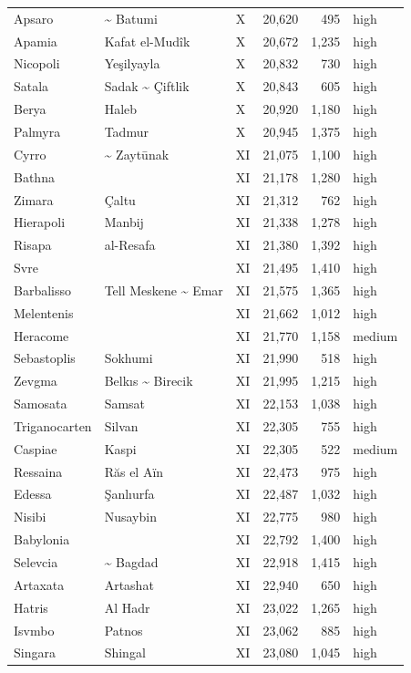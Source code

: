 \documentclass[11pt,a4paper]{article}
\begin{document}
{\begin{longtable}{p{4.6cm}p{5.2cm}lrrl}
Apsaro & \textasciitilde{} Batumi & X & 20,620 & 495 & high\\
Apamia & Kafat el-Mudîk & X & 20,672 & 1,235 & high\\
Nicopoli & Yeşilyayla & X & 20,832 & 730 & high\\
Satala & Sadak \textasciitilde{} Çiftlik & X & 20,843 & 605 & high\\
Berya & Haleb & X & 20,920 & 1,180 & high\\
Palmyra & Tadmur & X & 20,945 & 1,375 & high\\
Cyrro & \textasciitilde{} Zaytūnak & XI & 21,075 & 1,100 & high\\
Bathna &  & XI & 21,178 & 1,280 & high\\
Zimara & Çaltu & XI & 21,312 & 762 & high\\
Hierapoli & Manbij & XI & 21,338 & 1,278 & high\\
Risapa & al-Resafa & XI & 21,380 & 1,392 & high\\
Svre &  & XI & 21,495 & 1,410 & high\\
Barbalisso & Tell Meskene \textasciitilde{} Emar & XI & 21,575 & 1,365 & high\\
Melentenis &  & XI & 21,662 & 1,012 & high\\
Heracome &  & XI & 21,770 & 1,158 & medium\\
Sebastoplis & Sokhumi & XI & 21,990 & 518 & high\\
Zevgma & Belkıs \textasciitilde{} Birecik & XI & 21,995 & 1,215 & high\\
Samosata & Samsat & XI & 22,153 & 1,038 & high\\
Triganocarten & Silvan & XI & 22,305 & 755 & high\\
Caspiae & Kaspi & XI & 22,305 & 522 & medium\\
Ressaina & Răs el Aïn & XI & 22,473 & 975 & high\\
Edessa & Şanlıurfa & XI & 22,487 & 1,032 & high\\
Nisibi & Nusaybin & XI & 22,775 & 980 & high\\
Babylonia &  & XI & 22,792 & 1,400 & high\\
Selevcia & \textasciitilde{} Bagdad & XI & 22,918 & 1,415 & high\\
Artaxata & Artashat & XI & 22,940 & 650 & high\\
Hatris & Al Hadr & XI & 23,022 & 1,265 & high\\
Isvmbo & Patnos & XI & 23,062 & 885 & high\\
Singara & Shingal & XI & 23,080 & 1,045 & high\\

\end{longtable}}
\end{document}
